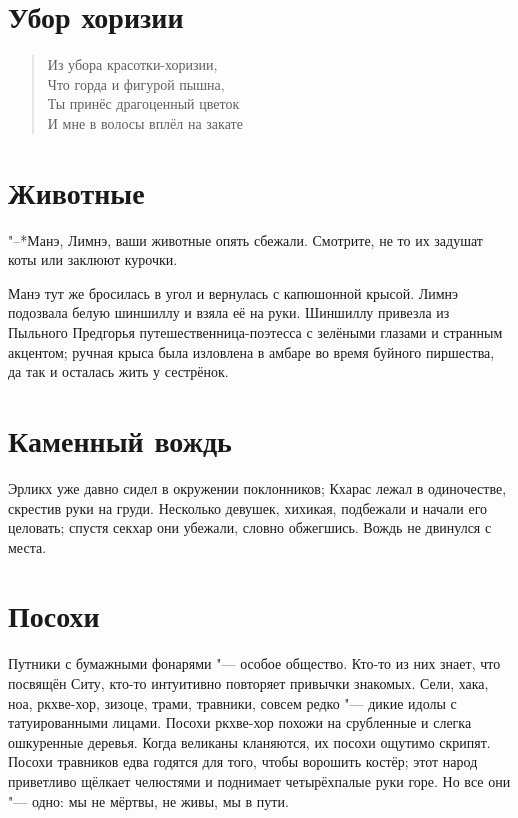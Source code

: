 \documentclass[a4paper,10pt,fleqn]{book}
\newcommand{\ldotst}{\so{...}\xspace}
\begin{document}
\section{Убор хоризии}

\begin{verse}
Из убора красотки-хоризии,\\
Что горда и фигурой пышна,\\
Ты принёс драгоценный цветок\\
И мне в волосы вплёл на закате\ldotst
\end{verse}

\section{Животные}

"--*Манэ, Лимнэ, ваши животные опять сбежали.
Смотрите, не то их задушат коты или заклюют курочки.

Манэ тут же бросилась в угол и вернулась с капюшонной крысой.
Лимнэ подозвала белую шиншиллу и взяла её на руки.
Шиншиллу привезла из Пыльного Предгорья путешественница-поэтесса с зелёными глазами и странным акцентом;
ручная крыса была изловлена в амбаре во время буйного пиршества, да так и осталась жить у сестрёнок.

\section{Каменный вождь}

Эрликх уже давно сидел в окружении поклонников;
Кхарас лежал в одиночестве, скрестив руки на груди.
Несколько девушек, хихикая, подбежали и начали его целовать;
спустя секхар они убежали, словно обжегшись.
Вождь не двинулся с места.

\section{Посохи}

Путники с бумажными фонарями "--- особое общество.
Кто-то из них знает, что посвящён Ситу, кто-то интуитивно повторяет привычки знакомых.
Сели, хака, ноа, ркхве-хор, зизоце, трами, травники, совсем редко "--- дикие идолы с татуированными лицами.
Посохи ркхве-хор похожи на срубленные и слегка ошкуренные деревья.
Когда великаны кланяются, их посохи ощутимо скрипят.
Посохи травников едва годятся для того, чтобы ворошить костёр;
этот народ приветливо щёлкает челюстями и поднимает четырёхпалые руки горе.
Но все они "--- одно: мы не мёртвы, не живы, мы в пути.
\end{document}
